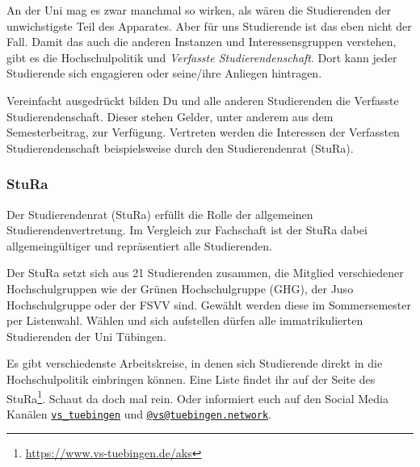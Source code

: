An der Uni mag es zwar manchmal so wirken, als wären die Studierenden der unwichstigste
Teil des Apparates.
Aber für uns Studierende ist das eben nicht der Fall.
Damit das auch die anderen Instanzen und Interessensgruppen verstehen, gibt es die Hochschulpolitik und \textit{Verfasste
Studierendenschaft}. Dort kann jeder Studierende sich engagieren oder seine/ihre
Anliegen hintragen.


Vereinfacht ausgedrückt bilden Du und alle anderen Studierenden die Verfasste Studierendenschaft. 
Dieser stehen Gelder, unter anderem aus dem Semesterbeitrag, zur Verfügung. 
Vertreten werden die Interessen der Verfassten Studierendenschaft beispielsweise durch den Studierendenrat (StuRa).


\subsubsection{StuRa}

Der Studierendenrat (StuRa) erfüllt die Rolle der allgemeinen Studierendenvertretung. 
Im Vergleich zur Fachschaft ist der StuRa dabei allgemeingültiger und repräsentiert alle Studierenden. 

Der StuRa setzt sich aus 21 Studierenden zusammen, die Mitglied verschiedener Hochschulgruppen wie der Grünen Hochschulgruppe (GHG), der Juso Hochschulgruppe
oder der FSVV sind. Gewählt werden diese im Sommersemester per Listenwahl. Wählen und sich aufstellen dürfen alle immatrikulierten Studierenden der Uni Tübingen.

Es gibt verschiedenste Arbeitskreise, in denen sich Studierende direkt in die Hochschulpolitik einbringen können.
Eine Liste findet ihr auf der Seite des StuRa\footnote{\url{https://www.vs-tuebingen.de/aks}}. %
Schaut da doch mal rein. Oder informiert euch auf den Social Media Kanälen 
\href{https://www.instagram.com/vs\_tuebingen}{\texttt{vs\_tuebingen}}
und \href{https://toot.kif.rocks/@vs@tuebingen.network}{\texttt{@vs@tuebingen.network}}.

